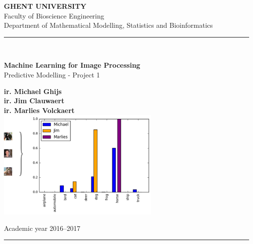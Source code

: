 

\begin{titlepage}
	\begin{center}
		{\Large\bf GHENT UNIVERSITY}\\[.5cm]
		{\Large Faculty of Bioscience Engineering}\\[.5cm]
		{\Large Department of Mathematical Modelling, Statistics and Bioinformatics}\\[.5cm]
		\hrule{\ }\\[.4cm]
	
		\vspace{3cm}
\begin{mdframed}[style=warning]
		\vspace{1cm}
\centering
		{{\huge \bf Machine Learning for Image Processing}}\\[1cm]
		{\LARGE Predictive Modelling - Project 1}
		\vspace{1cm}
\end{mdframed}
		\vspace{0.5cm}


	\end{center}
	
	\begin{center}
		{
		\large \bf ir. Michael Ghijs\\[.2cm]
		\large \bf ir. Jim Clauwaert\\[.2cm]
		\large \bf ir. Marlies Volckaert\\[.2cm]
		}%
		\vspace{1cm}
		\includegraphics[width=0.6\textwidth]{../figures/cifar_alles}


		
		\vspace{1cm}
		Academic year 2016--2017\\[.3cm]
		\hrule \vspace{.3cm}
	\end{center}
\end{titlepage}





